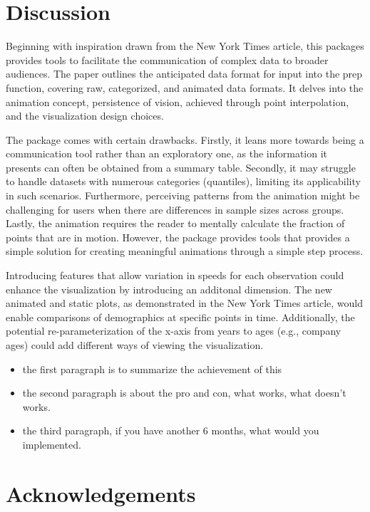 \hypertarget{discussion}{%
\section{Discussion}\label{discussion}}

Beginning with inspiration drawn from the New York Times article, this packages provides tools to facilitate the communication of complex data to broader audiences. The paper outlines the anticipated data format for input into the prep function, covering raw, categorized, and animated data formats. It delves into the animation concept, persistence of vision, achieved through point interpolation, and the visualization design choices.

The  package comes with certain drawbacks. Firstly, it leans more towards being a communication tool rather than an exploratory one, as the information it presents can often be obtained from a summary table. Secondly, it may struggle to handle datasets with numerous categories (quantiles), limiting its applicability in such scenarios. Furthermore, perceiving patterns from the animation might be challenging for users when there are differences in sample sizes across groups. Lastly, the animation requires the reader to mentally calculate the fraction of points that are in motion. However, the package provides tools that provides a simple solution for creating meaningful animations through a simple step process.

Introducing features that allow variation in speeds for each observation could enhance the visualization by introducing an additonal dimension. The new animated and static plots, as demonstrated in the New York Times article, would enable comparisons of demographics at specific points in time. Additionally, the potential re-parameterization of the x-axis from years to ages (e.g., company ages) could add different ways of viewing the visualization.

\begin{itemize}
\tightlist
\item
  the first paragraph is to summarize the achievement of this
\item
  the second paragraph is about the pro and con, what works, what doesn't works.
\item
  the third paragraph, if you have another 6 months, what would you implemented.
\end{itemize}

\hypertarget{acknowledgements}{%
\section*{Acknowledgements}\label{acknowledgements}}

